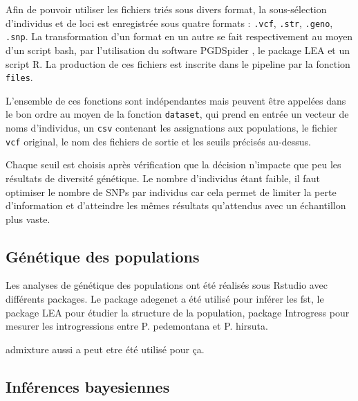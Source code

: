 Afin de pouvoir utiliser les fichiers triés sous divers format, la sous-sélection d'individus et de loci est enregistrée sous quatre formats : \verb|.vcf|, \verb|.str|, \verb|.geno|, \verb|.snp|. 
La transformation d'un format en un autre se fait respectivement au moyen d'un script bash, par l'utilisation du software PGDSpider \citep{Lischer2012}, le package LEA \citep{Frichot2015} et un script R. 
La production de ces fichiers est inscrite dans le pipeline par la fonction \verb|files|.

L'ensemble de ces fonctions sont indépendantes mais peuvent être appelées dans le bon ordre au moyen de la fonction \verb|dataset|, qui prend en entrée un vecteur de noms d'individus, un \verb|csv| contenant les assignations aux populations, le fichier \verb|vcf| original, le nom des fichiers de sortie et les seuils précisés au-dessus.


Chaque seuil est choisis après vérification que la décision n'impacte que peu les résultats de diversité génétique.
Le nombre d'individus étant faible, il faut optimiser le nombre de SNPs par individus car cela permet de limiter la perte d'information et d'atteindre les mêmes résultats qu'attendus avec un échantillon plus vaste. \citep{Nazareno2017}


\subsection{Génétique des populations}

Les analyses de génétique des populations ont été réalisés sous Rstudio \citep{RTeam2017} avec différents packages. 
Le package adegenet a été utilisé pour inférer les fst, le package LEA pour étudier la structure de la population, package Introgress pour mesurer les introgressions entre P. pedemontana et P. hirsuta.

admixture aussi a peut etre été utilisé pour ça.

\subsection{Inférences bayesiennes}

